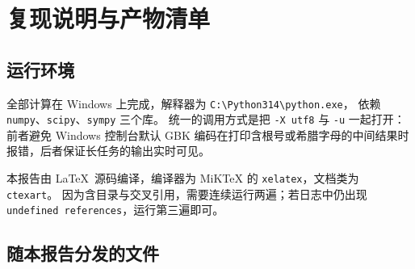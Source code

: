 \documentclass[UTF8,11pt]{ctexart}
\theoremstyle{definition}
\begin{document}
\appendix
\section{复现说明与产物清单}\label{app:repro}

\subsection{运行环境}

全部计算在 Windows 上完成，解释器为 \texttt{C:\textbackslash Python314\textbackslash python.exe}，
依赖 \texttt{numpy}、\texttt{scipy}、\texttt{sympy} 三个库。
统一的调用方式是把 \texttt{-X utf8} 与 \texttt{-u} 一起打开：前者避免 Windows 控制台默认 GBK
编码在打印含根号或希腊字母的中间结果时报错，后者保证长任务的输出实时可见。

\begin{center}
\end{center}

本报告由 \LaTeX\ 源码编译，编译器为 MiKTeX 的 \texttt{xelatex}，文档类为 \texttt{ctexart}。
因为含目录与交叉引用，需要连续运行两遍；若日志中仍出现 \texttt{undefined references}，运行第三遍即可。

\subsection{随本报告分发的文件}
\end{document}
